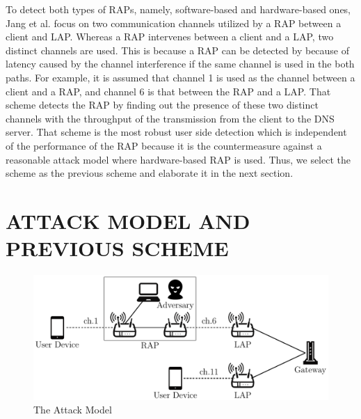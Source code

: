 \documentclass[conference]{IEEEtran}
\begin{document}
To detect both types of RAPs, namely, software-based and hardware-based ones, Jang et al. focus on two communication channels utilized by a RAP between a client and LAP\cite{previous}.
Whereas a RAP intervenes between a client and a LAP, two distinct channels are used.
This is because a RAP can be detected by \cite{rtt} because of latency caused by the channel interference if the same channel is used in the both paths.
For example, it is assumed that channel 1 is used as the channel between a client and a RAP, and channel 6 is that between the RAP and a LAP.
That scheme detects the RAP by finding out the presence of these two distinct channels with the throughput of the transmission from the client to the DNS server.
That scheme is the most robust user side detection which is independent of the performance of the RAP because it is the countermeasure against a reasonable attack model where hardware-based RAP is used.
Thus, we select the scheme \cite{previous} as the previous scheme and elaborate it in the next section.

\section{ATTACK MODEL AND PREVIOUS SCHEME}\label{sec:3}
\begin{figure}[t]
    \begin{center}
        \includegraphics[scale=0.45]{attack-model/attack-model.pdf}
        \caption{The Attack Model}
        \label{fig:model}
    \end{center}
\vspace{-2zh}
\end{figure}
\end{document}
